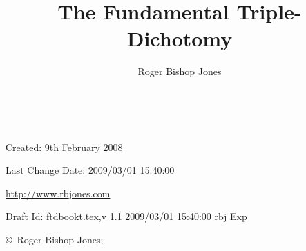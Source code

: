 \documentclass[10pt,titlepage,openany]{article}
\author{Roger Bishop Jones}
\title{The Fundamental Triple-Dichotomy}
\date{\ }
\begin{document}
\begin{titlepage}
\maketitle


\begin{centering}

{\footnotesize

Created: 9th February 2008

Last Change $ $Date: 2009/03/01 15:40:00 $ $

\href{http://www.rbjones.com/}
{http://www.rbjones.com}

Draft $ $Id: ftdbookt.tex,v 1.1 2009/03/01 15:40:00 rbj Exp $ $

\copyright\ Roger Bishop Jones;

}%

\end{centering}

\thispagestyle{empty}
\end{titlepage}

{\parskip=0pt\tableofcontents}
\end{document}
